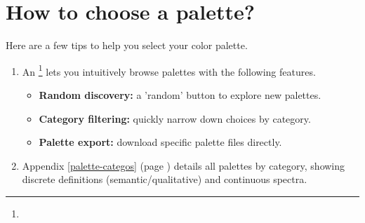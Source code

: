\documentclass{tutodoc}
\begin{document}
\section{How to choose a palette?}

Here are a few tips to help you select your color palette.
%
\begin{enumerate}
   \item An \thisdemo%
   \footnote{
       \thisdemourl
   }
   lets you intuitively browse palettes with the following features.
   \begin{itemize}
       \item \textbf{Random discovery:} a 'random' button to explore new palettes.

       \item \textbf{Category filtering:} quickly narrow down choices by category.

       \item \textbf{Palette export:} download specific palette files directly.
   \end{itemize}


   \item Appendix \ref{palette-categos} (page \pageref{palette-categos}) details all palettes by category, showing discrete definitions (semantic/qualitative) and continuous spectra.
\end{enumerate}
\end{document}
